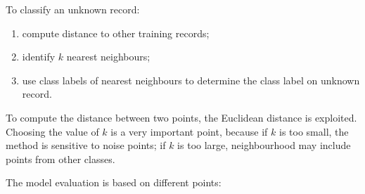 \begin{description}
\begin{description}
\begin{itemize}
		\end{itemize}
		To classify an unknown record:
		\begin{enumerate}
			\item
			compute distance to other training records;
			\item
			identify $k$ nearest neighbours;
			\item
			use class labels of nearest neighbours to determine the class label on unknown record.
		\end{enumerate}
		To compute the distance between two points, the Euclidean distance is exploited.
		Choosing the value of $k$ is a very important point, because if $k$ is too small, the method is sensitive to noise points; if $k$ is too large, neighbourhood may include points from other classes.
	\end{description}
\end{description}
The model evaluation is based on different points:
